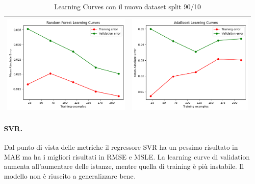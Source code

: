 \begin{table}[H]
\begin{tabularx}{\textwidth}{|X|X|}
        \includegraphics[width=\linewidth, trim=0 0 0 0]{images/RandomForest_lc90.png} &
        \includegraphics[width=\linewidth, trim=0 0 0 0]{images/AdaBoost_lc90.png} \\
        \hline
    \end{tabularx}
    \caption{Learning Curves con il nuovo dataset split 90/10}
    \label{tab:emissions_info}
\end{table}

\paragraph{\textbf{SVR}.}
Dal punto di vista delle metriche il regressore SVR ha un pessimo risultato in MAE ma ha i migliori risultati in RMSE e MSLE. La learning curve di validation aumenta all'aumentare delle istanze, mentre quella di training è più instabile. Il modello non è riuscito a generalizzare bene.


